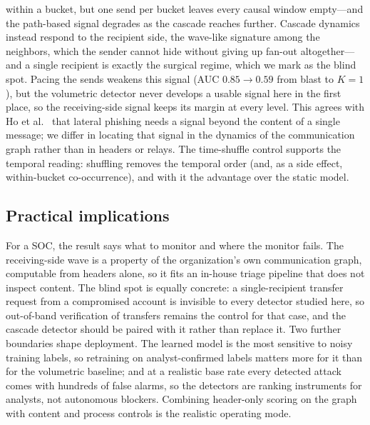 within a bucket, but one send per bucket leaves every causal window empty---and the path-based signal
degrades as the cascade reaches further. Cascade dynamics instead respond to the recipient side, the
wave-like signature among the neighbors, which the sender cannot hide without giving up fan-out
altogether---and a single recipient is exactly the surgical regime, which we mark as the blind spot. %
Pacing
the sends weakens this signal (AUC $0.85\!\to\!0.59$ from blast to $K{=}1$), but the volumetric
detector never develops a usable signal here in the first place, so the receiving-side signal keeps
its margin at every level. This
agrees with Ho et al.\ \citep{ho2019detecting} that lateral phishing needs a signal beyond the content of a
single message; we differ in locating that signal in the dynamics of the communication graph rather than in
headers or relays. The time-shuffle control supports the temporal reading: shuffling removes the temporal
order (and, as a side effect, within-bucket co-occurrence), and with it the advantage over the static model.

\subsection{Practical implications}
For a SOC, the result says what to monitor and where the monitor fails. The receiving-side wave is a
property of the organization's own communication graph, computable from headers alone, so it fits an in-house
triage pipeline that does not inspect content. The blind spot is equally concrete: a single-recipient
transfer request from a compromised account is invisible to every detector studied here, so out-of-band
verification of transfers remains the control for that case, and the cascade detector should be paired with
it rather than replace it. Two further boundaries shape deployment. The learned model is the most sensitive to
noisy training labels, so retraining on analyst-confirmed labels matters more for it than for the volumetric
baseline; and at a realistic base rate every detected attack comes with hundreds of false alarms, so the
detectors are ranking instruments for analysts, not autonomous blockers. Combining header-only scoring on
the graph with content and process controls is the realistic operating mode.


